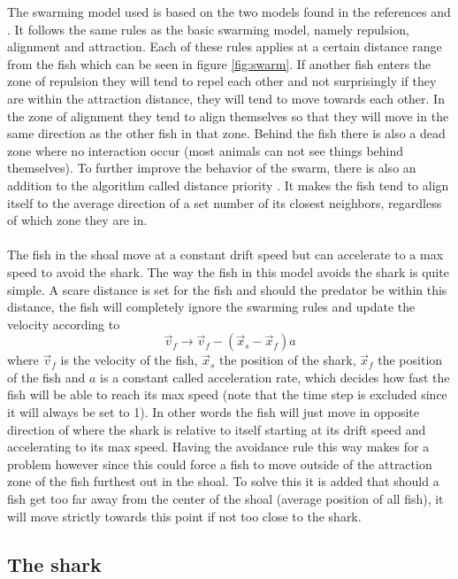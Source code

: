 The swarming model used is based on the two models found in the references \cite{javafish} and \cite{matlabfish}. It follows the same rules as the basic swarming model, namely repulsion, alignment and attraction. Each of these rules applies at a certain distance range from the fish which can be seen in figure \ref{fig:swarm}. If another fish enters the zone of repulsion they will tend to repel each other and not surprisingly if they are within the attraction distance, they will tend to move towards each other. In the zone of alignment they tend to align themselves so that they will move in the same direction as the other fish in that zone. Behind the fish there is also a dead zone where no interaction occur (most animals can not see things behind themselves). To further improve the behavior of the swarm, there is also an addition to the algorithm called distance priority \cite{matlabfish}. It makes the fish tend to align itself to the average direction of a set number of its closest neighbors, regardless of which zone they are in.\\
\\
The fish in the shoal move at a constant drift speed but can accelerate to a max speed to avoid the shark. The way the fish in this model avoids the shark is quite simple. A scare distance is set for the fish and should the predator be within this distance, the fish will completely ignore the swarming rules and update the velocity according to
\begin{equation}
\vec{v}_f \rightarrow \vec{v}_f - (\vec{x}_s - \vec{x}_f)a
\end{equation}
where $\vec{v}_f$ is the velocity of the fish, $\vec{x}_s$ the position of the shark, $\vec{x}_f$ the position of the fish and $a$ is a constant called acceleration rate, which decides how fast the fish will be able to reach its max speed (note that the time step is excluded since it will always be set to 1). In other words the fish will just move in opposite direction of where the shark is relative to itself starting at its drift speed and accelerating to its max speed. Having the avoidance rule this way makes for a problem however since this could force a fish to move outside of the attraction zone of the fish furthest out in the shoal. To solve this it is added that should a fish get too far away from the center of the shoal (average position of all fish), it will move strictly towards this point if not too close to the shark.

\subsection{The shark}

